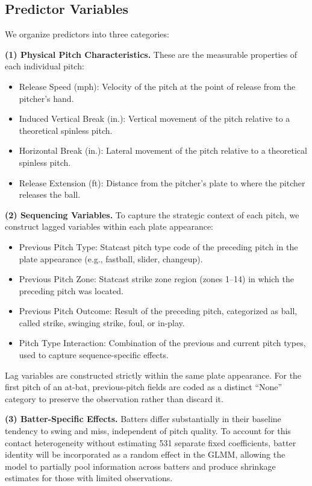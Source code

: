 \documentclass[11pt]{article}
\newcommand{\numBatters}{531}            %
\begin{document}
\subsection{Predictor Variables}

We organize predictors into three categories:

\medskip
\noindent\textbf{(1) Physical Pitch Characteristics.}
These are the measurable properties of each individual pitch:
\begin{itemize}[nosep]
    \item Release Speed (mph): Velocity of the pitch at the point of release from the pitcher's hand.
    \item Induced Vertical Break (in.): Vertical movement of the pitch relative to a theoretical spinless pitch.
    \item Horizontal Break (in.): Lateral movement of the pitch relative to a theoretical spinless pitch.
    \item Release Extension (ft): Distance from the pitcher's plate to where the pitcher releases the ball.
\end{itemize}

\medskip
\noindent\textbf{(2) Sequencing Variables.}
To capture the strategic context of each pitch, we construct lagged variables within each plate appearance:
\begin{itemize}[nosep]
    \item Previous Pitch Type: Statcast pitch type code of the preceding pitch in the plate appearance (e.g., fastball, slider, changeup).
    \item Previous Pitch Zone: Statcast strike zone region (zones 1--14) in which the preceding pitch was located.
    \item Previous Pitch Outcome: Result of the preceding pitch, categorized as ball, called strike, swinging strike, foul, or in-play.
    \item Pitch Type Interaction: Combination of the previous and current pitch types, used to capture sequence-specific effects.
\end{itemize}
Lag variables are constructed strictly within the same plate appearance.
For the first pitch of an at-bat, previous-pitch fields are coded as a distinct ``None'' category to preserve the observation rather than discard it.

\medskip
\noindent\textbf{(3) Batter-Specific Effects.}
Batters differ substantially in their baseline tendency to swing and miss, independent of pitch quality. 
To account for this contact heterogeneity without estimating \numBatters{} separate fixed coefficients, batter identity will be incorporated as a random effect in the GLMM, 
allowing the model to partially pool information across batters and produce shrinkage estimates for those with limited observations.
\end{document}
